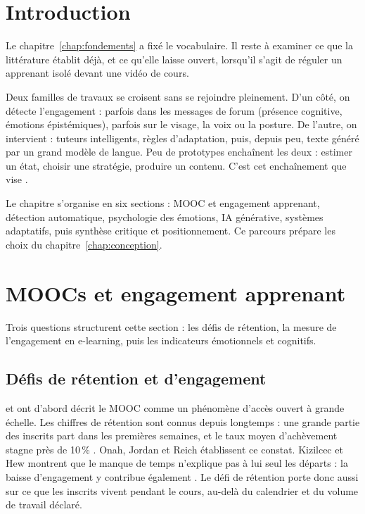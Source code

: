
\section{Introduction}
\label{sec:ea-intro}

Le chapitre~\ref{chap:fondements} a fixé le vocabulaire. Il reste à
examiner ce que la littérature établit déjà, et ce qu'elle laisse ouvert,
lorsqu'il s'agit de réguler un apprenant isolé devant une vidéo de cours.

Deux familles de travaux se croisent sans se rejoindre pleinement. D'un
côté, on détecte l'engagement : parfois dans les messages de forum
(présence cognitive, émotions épistémiques), parfois sur le visage, la voix
ou la posture. De l'autre, on intervient : tuteurs intelligents,
règles d'adaptation, puis, depuis peu, texte généré par un grand modèle de
langue. Peu de prototypes enchaînent les deux : estimer un état, choisir une
stratégie, produire un contenu. C'est cet enchaînement que vise
\emolearn{}.

Le chapitre s'organise en six sections : MOOC et engagement apprenant,
détection automatique, psychologie des émotions, IA générative, systèmes
adaptatifs, puis synthèse critique et positionnement. Ce parcours prépare
les choix du chapitre~\ref{chap:conception}.

\section{MOOCs et engagement apprenant}
\label{sec:ea-mooc}

Trois questions structurent cette section : les défis de rétention, la
mesure de l'engagement en e-learning, puis les indicateurs émotionnels
et cognitifs.

\subsection{Défis de rétention et d'engagement}
\label{sec:ea-mooc-retention}

\textcite{daniel2012making} et \textcite{breslow2013studying}
ont d'abord décrit le MOOC comme un phénomène
d'accès ouvert à grande échelle. Les chiffres de rétention
sont connus depuis longtemps : une grande partie des inscrits part dans
les premières semaines, et le taux moyen d'achèvement stagne près de
10\,\% \cite{onah2014dropout,jordan2015massive,reich2019mooc}. Onah,
Jordan et Reich établissent ce constat. Kizilcec et Hew montrent que le
manque de temps n'explique pas à lui seul les départs : la baisse
d'engagement y contribue également
\cite{kizilcec2013deconstructing,hew2016promoting}. Le défi de rétention
porte donc aussi sur ce que les inscrits vivent pendant le cours, au-delà
du calendrier et du volume de travail déclaré.

